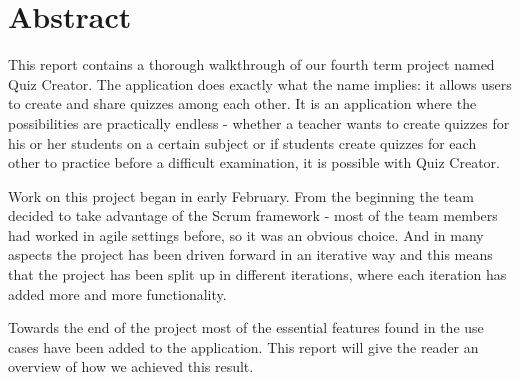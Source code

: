 \chapter*{Abstract}
This report contains a thorough walkthrough of our fourth term project named Quiz Creator. The application does exactly what the name implies: it allows users to create and share quizzes among each other. It is an application where the possibilities are practically endless - whether a teacher wants to create quizzes for his or her students on a certain subject or if students create quizzes for each other to practice before a difficult examination, it is possible with Quiz Creator. 

Work on this project began in early February. From the beginning the team decided to take advantage of the Scrum framework - most of the team members had worked in agile settings before, so it was an obvious choice. And in many aspects the project has been driven forward in an iterative way and this means that the project has been split up in different iterations, where each iteration has added more and more functionality. 

Towards the end of the project most of the essential features found in the use cases have been added to the application. This report will give the reader an overview of how we achieved this result. 
